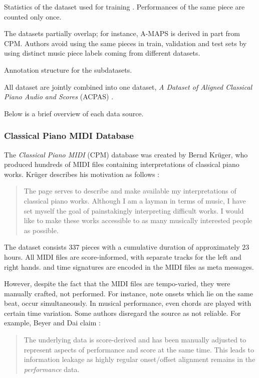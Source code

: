 \begin{table}[ht!]
\centering

\caption[Statistics of the dataset used for training.]{Statistics of the dataset used for training \cite{Liu2022}. Performances of the same piece are counted only once.}
\label{train_valid_test}
\end{table}

The datasets partially overlap; for instance, A-MAPS is derived in part from CPM. Authors avoid using the same pieces in train, validation and test sets by using distinct music piece labels coming from different datasets.

\begin{table}[ht!]
\begin{center}

\caption[Annotation structure for the subdatasets.]{Annotation structure for the subdatasets.}
\end{center}
\end{table}

All dataset are jointly combined into one dataset, \emph{A Dataset of Aligned Classical Piano Audio and Scores} (ACPAS) \cite{Liu2021}.

Below is a brief overview of each data source.

\subsubsection{Classical Piano MIDI Database}

The \emph{Classical Piano MIDI} (CPM) database was created by Bernd Krüger, who produced hundreds of MIDI files containing interpretations of classical piano works. Krüger describes his motivation as follows \cite{Krueger1996}:

\begin{quote}The page serves to describe and make available my interpretations of classical piano works. Although I am a layman in terms of music, I have set myself the goal of painstakingly interpreting difficult works. I would like to make these works accessible to as many musically interested people as possible.\end{quote}

The dataset consists 337 pieces with a cumulative duration of approximately $23$ hours. All MIDI files are score-informed, with separate tracks for the left and right hands.  and time signatures are encoded in the MIDI files as meta messages.

However, despite the fact that the MIDI files are tempo-varied, they were manually crafted, not performed. For instance, note onsets which lie on the same beat, occur simultaneously. In musical performance, even chords are played with certain time variation. Some authors disregard the source as not reliable. For example, Beyer and Dai claim \cite{Beyer2024}: \begin{quote}The underlying data is score-derived and has been manually adjusted to represent aspects of performance and score at the same time. This leads to information leakage as highly regular onset/offset alignment remains in the \emph{performance} data.\end{quote}

